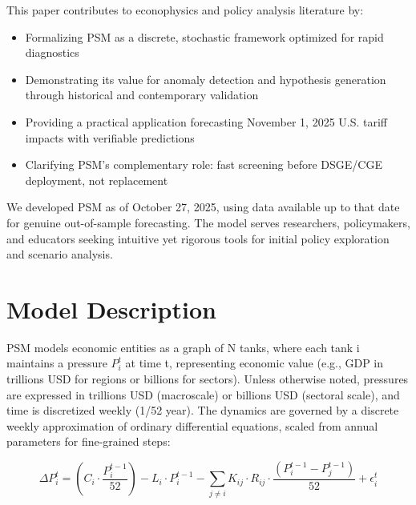 \documentclass[11pt]{article}
\begin{document}
This paper contributes to econophysics and policy analysis literature by:
\begin{itemize}
\item Formalizing PSM as a discrete, stochastic framework optimized for rapid diagnostics
\item Demonstrating its value for anomaly detection and hypothesis generation through historical and contemporary validation
\item Providing a practical application forecasting November 1, 2025 U.S. tariff impacts with verifiable predictions
\item Clarifying PSM's complementary role: fast screening before DSGE/CGE deployment, not replacement
\end{itemize}

We developed PSM as of October 27, 2025, using data available up to that date for genuine out-of-sample forecasting. The model serves researchers, policymakers, and educators seeking intuitive yet rigorous tools for initial policy exploration and scenario analysis.

\section{Model Description}
PSM models economic entities as a graph of N tanks, where each tank i maintains a pressure $P_i^t$ at time t, representing economic value (e.g., GDP in trillions USD for regions or billions for sectors). Unless otherwise noted, pressures are expressed in trillions USD (macroscale) or billions USD (sectoral scale), and time is discretized weekly (1/52 year). The dynamics are governed by a discrete weekly approximation of ordinary differential equations, scaled from annual parameters for fine-grained steps:

\[
\Delta P_i^t = \left( C_i \cdot \frac{P_i^{t-1}}{52} \right) - L_i \cdot P_i^{t-1} - \sum_{j \neq i} K_{ij} \cdot R_{ij} \cdot \frac{(P_i^{t-1} - P_j^{t-1})}{52} + \epsilon_i^t
\]
\end{document}
